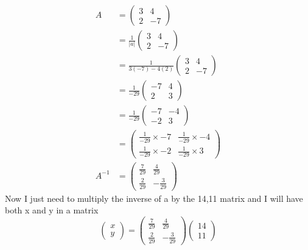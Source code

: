 \documentclass{article}
\begin{document}
\begin{align*}
	A  &=
	\begin{pmatrix}
		3 & 4\\
		2 & -7
	\end{pmatrix}
	\\
	&= \frac{1}{|a|}
	\begin{pmatrix}
		3 & 4\\
		2 & -7
	\end{pmatrix}
	\\
	&= \frac{1}{3(-7) - 4(2)}
	\begin{pmatrix}
		3 & 4\\
		2 & -7
	\end{pmatrix}
	\\
	&= \frac{1}{-29}
	\begin{pmatrix}
		-7 & 4\\
		2 & 3
	\end{pmatrix}
	\\
	&= \frac{1}{-29}
	\begin{pmatrix}
		-7 & -4\\
		-2 & 3
	\end{pmatrix}
	\\
	&=
	\begin{pmatrix}
		\frac{1}{-29}\times-7 & \frac{1}{-29}\times-4\\
		\frac{1}{-29}\times-2 & \frac{1}{-29}\times3
	\end{pmatrix}
	\\
	A^{-1}&=
	\begin{pmatrix}
		\frac{7}{29} & \frac{4}{29}\\
		\frac{2}{29} & -\frac{3}{29}
	\end{pmatrix}
\end{align*}
Now I just need to multiply the inverse of a by the 14,11 matrix and I will have both x and y in a matrix
\[
	\begin{pmatrix}
		x\\
		y
	\end{pmatrix}
	=
	\begin{pmatrix}
		\frac{7}{29} & \frac{4}{29}\\
		\frac{2}{29} & -\frac{3}{29}
	\end{pmatrix}
	\begin{pmatrix}
		14\\
		11
	\end{pmatrix}
\]
\end{document}
